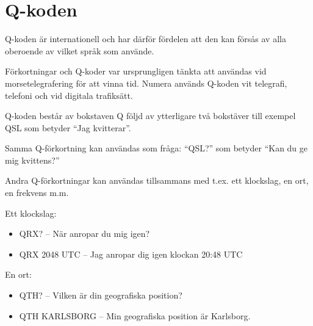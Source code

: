\section{Q-koden}

Q-koden är internationell och har därför fördelen att den kan försås
av alla oberoende av vilket språk som använde.

Förkortningar och Q-koder var ursprungligen tänkta att användas vid
morsetelegrafering för att vinna tid. Numera används Q-koden vit
telegrafi, telefoni och vid digitala trafiksätt.

Q-koden består av bokstaven Q följd av ytterligare två bokstäver till
exempel QSL som betyder ``Jag kvitterar''.

Samma Q-förkortning kan användas som fråga: ``QSL?'' som betyder ``Kan
du ge mig kvittens?''

Andra Q-förkortningar kan användas tillsammans med t.ex. ett
klockslag, en ort, en frekvens m.m.

Ett klockslag:
\begin{itemize}
  \item QRX? -- När anropar du mig igen?
  \item QRX 2048 UTC -- Jag anropar dig igen klockan 20:48 UTC
\end{itemize}

En ort:

\begin{itemize}
\item QTH? -- Vilken är din geografiska position?
\item QTH KARLSBORG -- Min geografiska position är Karlsborg.
\end{itemize}


